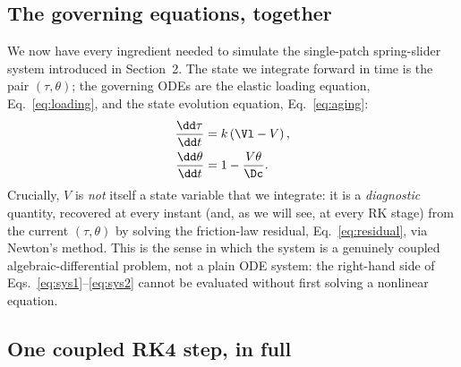 \subsection{The governing equations, together}

We now have every ingredient needed to simulate the single-patch spring-slider system introduced in Section~2. The state we integrate forward in time is the pair $(\tau, \theta)$; the governing ODEs are the elastic loading equation, Eq.~\eqref{eq:loading}, and the state evolution equation, Eq.~\eqref{eq:aging}:
\begin{align}
\frac{\dd \tau}{\dd t} &= k\left(\Vl - V\right), \label{eq:sys1}\\
\frac{\dd \theta}{\dd t} &= 1 - \frac{V\theta}{\Dc}. \label{eq:sys2}
\end{align}
Crucially, $V$ is \emph{not} itself a state variable that we integrate: it is a \emph{diagnostic} quantity, recovered at every instant (and, as we will see, at every RK stage) from the current $(\tau, \theta)$ by solving the friction-law residual, Eq.~\eqref{eq:residual}, via Newton's method. This is the sense in which the system is a genuinely coupled algebraic-differential problem, not a plain ODE system: the right-hand side of Eqs.~\eqref{eq:sys1}--\eqref{eq:sys2} cannot be evaluated without first solving a nonlinear equation.

\subsection{One coupled RK4 step, in full}


